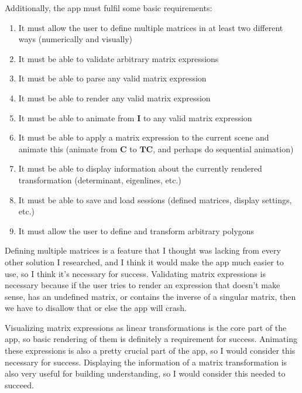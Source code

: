 \documentclass[../main.tex]{subfiles}
\begin{document}
Additionally, the app must fulfil some basic requirements:
\vspace{-0.3cm}
\begin{enumerate}
	\item\label{success-criterion:define-multiple-matrices} It must allow the user to define multiple matrices in at least two different ways (numerically and visually)
	\item\label{success-criterion:validate-arbitrary-matrix-expressions} It must be able to validate arbitrary matrix expressions
	\item\label{success-criterion:parse-matrix-expressions} It must be able to parse any valid matrix expression
	\item\label{success-criterion:render-any-valid-expression} It must be able to render any valid matrix expression
	\item\label{success-criterion:animate-any-valid-expression} It must be able to animate from $\mathbf{I}$ to any valid matrix expression
	\item\label{success-criterion:applicative-animation} It must be able to apply a matrix expression to the current scene and animate this (animate from $\mathbf{C}$ to $\mathbf{TC}$, and perhaps do sequential animation)
	\item\label{success-criterion:display-matrix-info} It must be able to display information about the currently rendered transformation (determinant, eigenlines, etc.)
	\item\label{success-criterion:save-and-load-sessions} It must be able to save and load sessions (defined matrices, display settings, etc.)
	\item\label{success-criterion:transform-polygons} It must allow the user to define and transform arbitrary polygons
\end{enumerate}

Defining multiple matrices is a feature that I thought was lacking from every other solution I researched, and I think it would make the app much easier to use, so I think it's necessary for success. Validating matrix expressions is necessary because if the user tries to render an expression that doesn't make sense, has an undefined matrix, or contains the inverse of a singular matrix, then we have to disallow that or else the app will crash.

Visualizing matrix expressions as linear transformations is the core part of the app, so basic rendering of them is definitely a requirement for success. Animating these expressions is also a pretty crucial part of the app, so I would consider this necessary for success. Displaying the information of a matrix transformation is also very useful for building understanding, so I would consider this needed to succeed.
\end{document}

